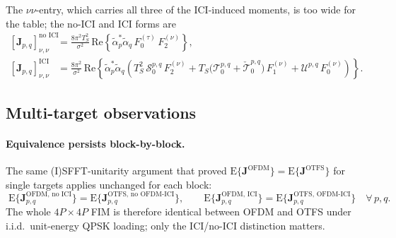 \documentclass[11pt]{article}
\begin{document}
The \(\nu\nu\)-entry, which carries all three of the ICI-induced
moments, is too wide for the table; the no-ICI and ICI forms are
\begin{align}
    {[\bm{J}_{p,q}]_{\nu,\nu}^{\text{no ICI}}} &=
        \tfrac{8\pi^2 T_S^2}{\sigma^2}\,
        \mathrm{Re}\!\left\{\tilde{\alpha}_p^*\tilde{\alpha}_q\,
            F_0^{(\tau)}\, F_2^{(\nu)}\right\}, \\
    {[\bm{J}_{p,q}]_{\nu,\nu}^{\text{ICI}}} &=
        \tfrac{8\pi^2}{\sigma^2}\,
        \mathrm{Re}\!\left\{\tilde{\alpha}_p^*\tilde{\alpha}_q\!
            \left(T_S^2\,\mathcal{S}_0^{p,q}\, F_2^{(\nu)}
                + T_S\bigl(\mathcal{T}_0^{p,q} + \check{\mathcal{T}}_0^{p,q}\bigr)\, F_1^{(\nu)}
                + \mathcal{U}^{p,q}\, F_0^{(\nu)}\right)\right\}.
\label{eq:Jpq_nunu}
\end{align}

\subsection*{Multi-target observations}

\paragraph{Equivalence persists block-by-block.} The same
(I)SFFT-unitarity argument that proved
\(\mathrm{E}\{\bm{J}^{\text{OFDM}}\} =
\mathrm{E}\{\bm{J}^{\text{OTFS}}\}\) for single targets applies
unchanged for each block:
\begin{equation}
    \boxed{\;
    \mathrm{E}\{\bm{J}_{p,q}^{\text{OFDM, no ICI}}\} =
    \mathrm{E}\{\bm{J}_{p,q}^{\text{OTFS, no OFDM-ICI}}\},
    \qquad
    \mathrm{E}\{\bm{J}_{p,q}^{\text{OFDM, ICI}}\} =
    \mathrm{E}\{\bm{J}_{p,q}^{\text{OTFS, OFDM-ICI}}\}
    \quad\forall\, p,q.
    \;}
\end{equation}
The whole \(4P\times 4P\) FIM is therefore identical between OFDM and
OTFS under i.i.d.\ unit-energy QPSK loading; only the ICI/no-ICI
distinction matters.
\end{document}
